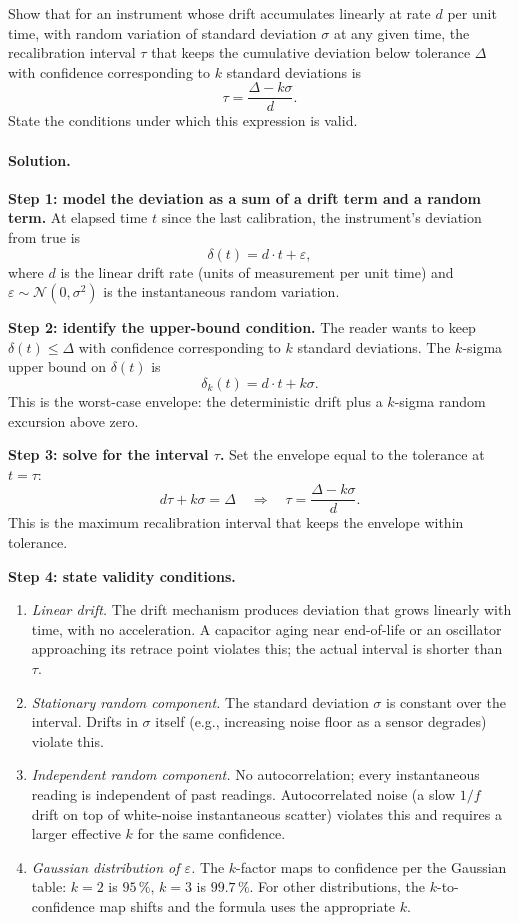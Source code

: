 \begin{exercise}
Show that for an instrument whose drift accumulates linearly at rate
$d$ per unit time, with random variation of standard deviation
$\sigma$ at any given time, the recalibration interval $\tau$ that
keeps the cumulative deviation below tolerance $\Delta$ with
confidence corresponding to $k$ standard deviations is
\[
\tau = \frac{\Delta - k\sigma}{d}.
\]
State the conditions under which this expression is valid.

\paragraph{Solution.}
\textbf{Step 1: model the deviation as a sum of a drift term and
a random term.} At elapsed time $t$ since the last calibration,
the instrument's deviation from true is
\[
\delta(t) = d \cdot t + \varepsilon,
\]
where $d$ is the linear drift rate (units of measurement per unit
time) and $\varepsilon \sim \mathcal{N}(0, \sigma^{2})$ is the
instantaneous random variation.

\textbf{Step 2: identify the upper-bound condition.} The reader
wants to keep $\delta(t) \leq \Delta$ with confidence
corresponding to $k$ standard deviations. The $k$-sigma upper
bound on $\delta(t)$ is
\[
\delta_{k}(t) = d \cdot t + k \sigma.
\]
This is the worst-case envelope: the deterministic drift plus a
$k$-sigma random excursion above zero.

\textbf{Step 3: solve for the interval $\tau$.} Set the envelope
equal to the tolerance at $t = \tau$:
\[
d \tau + k \sigma = \Delta
\quad\Longrightarrow\quad
\tau = \frac{\Delta - k \sigma}{d}.
\]
This is the maximum recalibration interval that keeps the
envelope within tolerance.

\textbf{Step 4: state validity conditions.}
\begin{enumerate}
  \item \emph{Linear drift.} The drift mechanism produces
  deviation that grows linearly with time, with no acceleration.
  A capacitor aging near end-of-life or an oscillator approaching
  its retrace point violates this; the actual interval is shorter
  than $\tau$.
  \item \emph{Stationary random component.} The standard deviation
  $\sigma$ is constant over the interval. Drifts in $\sigma$
  itself (e.g., increasing noise floor as a sensor degrades)
  violate this.
  \item \emph{Independent random component.} No autocorrelation;
  every instantaneous reading is independent of past readings.
  Autocorrelated noise (a slow $1/f$ drift on top of
  white-noise instantaneous scatter) violates this and requires
  a larger effective $k$ for the same confidence.
  \item \emph{Gaussian distribution of $\varepsilon$.} The
  $k$-factor maps to confidence per the Gaussian table:
  $k = 2$ is $95\,\%$, $k = 3$ is $99.7\,\%$. For other
  distributions, the $k$-to-confidence map shifts and the formula
  uses the appropriate $k$.
\end{enumerate}


\end{exercise}
